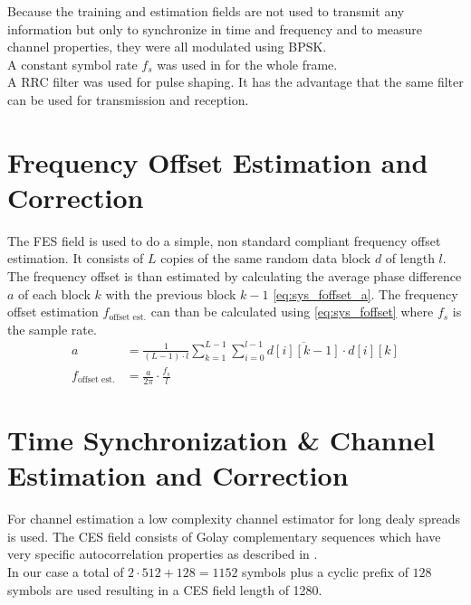 Because the training and estimation fields are not used to
transmit any information but only to synchronize in time
and frequency and to measure channel properties, they were all
modulated using \gls{BPSK}. \\

A constant symbol rate $f_s$ was used in for the whole frame. \\

A \gls{RRC} filter was used for pulse shaping. It has the advantage that
the same filter can be used for transmission and reception. \\

\section{Frequency Offset Estimation and Correction}
\label{sec:sys_fes}
The \gls{FES} field is used to do a simple, non standard compliant frequency
offset estimation. It consists of $L$ copies of the same random data block $d$
of length $l$.
The frequency offset is than estimated by calculating the average phase
difference $a$ of each block $k$ with the previous block $k - 1$
\eqref{eq:sys_foffset_a}. The frequency offset estimation
$f_{\text{offset est.}}$ can than be calculated using \eqref{eq:sys_foffset}
where $f_s$ is the sample rate. \\

\begin{subequations}
  \begin{alignat}{2}
    a &= \frac{1}{(L-1) \cdot l}
    \sum_{k=1}^{L-1} \sum_{i=0}^{l-1} \overline{d[i][k-1]} \cdot d[i][k]
    \label{eq:sys_foffset_a} \\
    f_{\text{offset est.}} &= \frac{a}{2 \pi} \cdot \frac{f_s}{l}
    \label{eq:sys_foffset}
  \end{alignat}
\end{subequations}

\section{Time Synchronization \& Channel Estimation and Correction}
\label{sec:sys_ces}
For channel estimation a low complexity channel estimator for long dealy
spreads is used.
The \gls{CES} field consists of Golay complementary sequences which
have very specific autocorrelation properties as described in \cite{golay}. \\

In our case a total of $2 \cdot 512 + 128 = 1152$ symbols plus
a cyclic prefix of $128$ symbols are used resulting in a \gls{CES} field
length of 1280. \\

